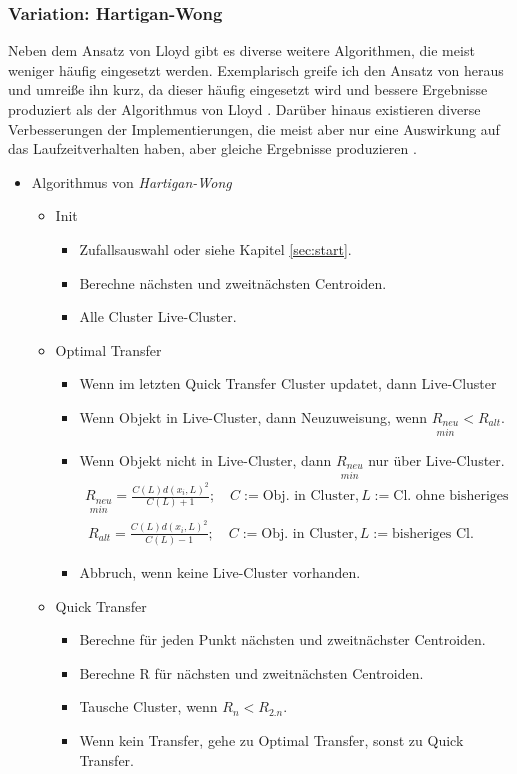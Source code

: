 \documentclass[a4paper,12pt,twoside]{article}
\newcommand{\Fachbegriff}[1]{\textit{#1}}
\begin{document}
\subsubsection{Variation: Hartigan-Wong}
\label{sec:hartigan}
Neben dem Ansatz von Lloyd gibt es diverse weitere Algorithmen, die meist weniger häufig eingesetzt werden. Exemplarisch greife ich den Ansatz von \textcite{Hartigan.1979} heraus und umreiße ihn kurz, da dieser häufig eingesetzt wird und bessere Ergebnisse produziert als der Algorithmus von Lloyd \autocite{Slonim.2013}. Darüber hinaus existieren diverse Verbesserungen der Implementierungen, die meist aber nur eine Auswirkung auf das Laufzeitverhalten haben, aber gleiche Ergebnisse produzieren \autocite[z.\,B.][]{ERICWENGROWSKI.2014, Hamerly.04292010, Elkan.2003}.

\begin{itemize}
\item Algorithmus von \Fachbegriff{Hartigan-Wong}
\begin{itemize}
\item Init
\begin{itemize}
\item Zufallsauswahl oder siehe Kapitel \ref{sec:start}.
\item Berechne nächsten und zweitnächsten Centroiden.
\item Alle Cluster Live-Cluster.
\end{itemize}
\item Optimal Transfer
\begin{itemize}
\item Wenn im letzten Quick Transfer Cluster updatet, dann Live-Cluster 
\item Wenn Objekt in Live-Cluster, dann Neuzuweisung, wenn $\underset{min}{R_{neu}} < R_{alt}$.
\item Wenn Objekt nicht in Live-Cluster, dann $\underset{min}{R_{neu}}$ nur über Live-Cluster.
\begin{equation}
\begin{split}
\underset{min}{R_{neu}} = \frac{C(L) d(x_i,L)^2}{C(L) + 1}; \quad C:= \text{Obj. in Cluster}, L:=\text{Cl. ohne bisheriges} \\\
R_{alt}= \frac{C(L) d(x_i,L)^2}{C(L) - 1}; \quad C:= \text{Obj. in Cluster}, L:=\text{bisheriges Cl.}
\end{split}
\end{equation}
\item Abbruch, wenn keine Live-Cluster vorhanden.
\end{itemize}
\item Quick Transfer
\begin{itemize}
\item Berechne für jeden Punkt nächsten und zweitnächster Centroiden.
\item Berechne R für nächsten und zweitnächsten Centroiden.
\item Tausche Cluster, wenn $R_n < R_{2.n}$.
\item Wenn kein Transfer, gehe zu Optimal Transfer, sonst zu Quick Transfer.
\end{itemize}
\end{itemize}
\end{itemize}
\end{document}
